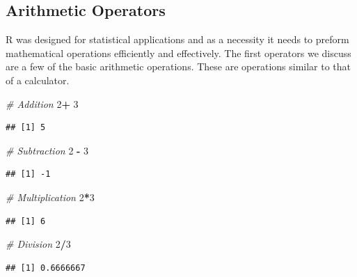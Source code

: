 \documentclass[
]{book}
\newenvironment{Shaded}{\begin{snugshade}}{\end{snugshade}}
\newcommand{\CommentTok}[1]{\textcolor[rgb]{0.56,0.35,0.01}{\textit{#1}}}
\newcommand{\DecValTok}[1]{\textcolor[rgb]{0.00,0.00,0.81}{#1}}
\newcommand{\OperatorTok}[1]{\textcolor[rgb]{0.81,0.36,0.00}{\textbf{#1}}}
\newcommand{\StringTok}[1]{\textcolor[rgb]{0.31,0.60,0.02}{#1}}
\begin{document}
\hypertarget{arithmetic-operators}{%
\subsection*{Arithmetic Operators}\label{arithmetic-operators}}

R was designed for statistical applications and as a necessity it needs to preform mathematical operations efficiently and effectively. The first operators we discuss are a few of the basic arithmetic operations. These are operations similar to that of a calculator.

\begin{Shaded}
\begin{Highlighting}[]
\CommentTok{# Addition }
\DecValTok{2}\OperatorTok{+}\StringTok{ }\DecValTok{3}
\end{Highlighting}
\end{Shaded}

\begin{verbatim}
## [1] 5
\end{verbatim}

\begin{Shaded}
\begin{Highlighting}[]
\CommentTok{# Subtraction }
\DecValTok{2} \OperatorTok{-}\StringTok{ }\DecValTok{3}
\end{Highlighting}
\end{Shaded}

\begin{verbatim}
## [1] -1
\end{verbatim}

\begin{Shaded}
\begin{Highlighting}[]
\CommentTok{# Multiplication }
\DecValTok{2}\OperatorTok{*}\DecValTok{3}
\end{Highlighting}
\end{Shaded}

\begin{verbatim}
## [1] 6
\end{verbatim}

\begin{Shaded}
\begin{Highlighting}[]
\CommentTok{# Division }
\DecValTok{2}\OperatorTok{/}\DecValTok{3}
\end{Highlighting}
\end{Shaded}

\begin{verbatim}
## [1] 0.6666667
\end{verbatim}
\end{document}
